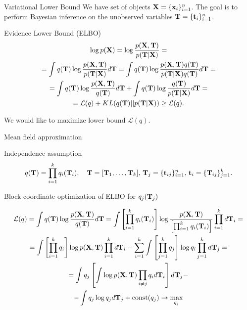 \documentclass{beamer}
\begin{document}
\begin{frame}{Variational Lower Bound}
    We have set of objects $\mathbf{X} = \{\mathbf{x}_i\}_{i=1}^n$. 
    The goal is to perform Bayesian inference on the unobserved variables $\mathbf{T} = \{\mathbf{t}_i\}_{i=1}^n$.
    \begin{block}{Evidence Lower Bound (ELBO)}
    \vspace{-0.3cm}
        \begin{multline*}
    		\log p(\mathbf{X}) 
    		= \log \frac{p(\mathbf{X}, \mathbf{T})}{p(\mathbf{T}|\mathbf{X})} = \\ 
    		= \int q(\mathbf{T}) \log \frac{p(\mathbf{X}, \mathbf{T})}{p(\mathbf{T}|\mathbf{X})}d\mathbf{T}
    		= \int q(\mathbf{T}) \log \frac{p(\mathbf{X}, \mathbf{T}) q(\mathbf{T})}{p(\mathbf{T}|\mathbf{X}) q(\mathbf{T})} d\mathbf{T} = \\
    		= \int q(\mathbf{T}) \log \frac{p(\mathbf{X}, \mathbf{T})}{q(\mathbf{T})}d\mathbf{T} + \int q(\mathbf{T}) \log \frac{q(\mathbf{T})}{p(\mathbf{T}|\mathbf{X})}d\mathbf{T} = \\ 
    		= \mathcal{L} (q) + KL(q(\mathbf{T}) || p(\mathbf{T}|\mathbf{X})) \geq \mathcal{L} (q).
    	\end{multline*}
        \vspace{-0.3cm}
    \end{block}
	We would like to maximize lower bound $\mathcal{L}(q)$.
\end{frame}
\begin{frame}{Mean field approximation}
    \begin{block}{Independence assumption}
    \vspace{-0.3cm}
    \[
    q(\mathbf{T}) = \prod_{i=1}^k q_i(\mathbf{T}_i), \quad \mathbf{T} = [\mathbf{T}_1, \dots, \mathbf{T}_k], \, \mathbf{T}_j = \{ \mathbf{t}_{ij}\}_{i=1}^n, \, \mathbf{t}_i = \{ \mathbf{T}_{ij}\}_{j=1}^k.
    \]
    \vspace{-0.3cm}
    \end{block}
    \begin{block}{Block coordinate optimization of ELBO for $q_j(\mathbf{T}_j)$}
  
    {\footnotesize
    \vspace{-0.3cm}
        \begin{multline*}
    		\mathcal{L} (q)
    		= \int q(\mathbf{T}) \log \frac{p(\mathbf{X}, \mathbf{T})}{q(\mathbf{T})}d\mathbf{T}
    		= \int \left[\prod_{i=1}^k q_i(\mathbf{T}_i) \right] \log \frac{p(\mathbf{X}, \mathbf{T})}{\left[\prod_{i=1}^k q_i(\mathbf{T}_i) \right]}  \prod_{i=1}^k d \mathbf{T}_i = \\
    		= \int \left[ \prod_{i=1}^k q_i \right] \log p(\mathbf{X}, \mathbf{T}) \prod_{i=1}^k d \mathbf{T}_i  
    		- \sum_{i=1}^k \int \left[ \prod_{j=1}^k q_j \right] \log q_i \prod_{j=1}^k d \mathbf{T}_j = \\
    		= \int q_j \left[\int  \log p(\mathbf{X}, \mathbf{T}) \prod_{i \neq j} q_i d \mathbf{T}_i \right] d \mathbf{T}_j - \\
    		- \int q_j \log q_j d\mathbf{T}_j + \text{const}(q_j) \rightarrow \max_{q_j}
    	\end{multline*}
        \vspace{-0.3cm}}
    \end{block}
\end{frame}
\end{document}
